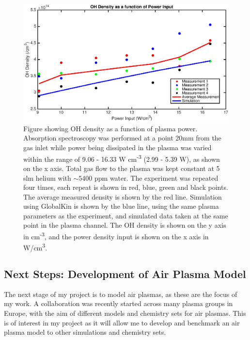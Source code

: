 \documentclass[11pt, oneside]{article}   	%
\begin{document}
\begin{figure}
\includegraphics[width=\textwidth]{Figures/PowerVariation}
\caption{Figure showing OH density as a function of plasma power. Absorption spectroscopy was performed at a point 20mm from the gas inlet while power being dissipated in the plasma was varied within the range of 9.06 - 16.33 W cm\textsuperscript{-3} (2.99 - 5.39 W), as shown on the x axis. Total gas flow to the plasma was kept constant at 5 slm helium with $\sim$5400 ppm water. The experiment was repeated four times, each repeat is shown in red, blue, green and black points. The average measured density is shown by the red line.
Simulation using GlobalKin is shown by the blue line, using the same plasma parameters as the experiment, and simulated data taken at the same point in the plasma channel.
The OH density is shown on the y axis in cm\textsuperscript{-3}, and the power density input is shown on the x axis in W/cm\textsuperscript{3}.}
\label{PowerVariation}
\end{figure}


\subsection{Next Steps: Development of Air Plasma Model}

The next stage of my project is to model air plasmas, as these are the focus of my work.
A collaboration was recently started across many plasma groups in Europe, with the aim of different models and chemistry sets for air plasmas.
This is of interest in my project as it will allow me to develop and benchmark an air plasma model to other simulations and chemistry sets.
\end{document}
